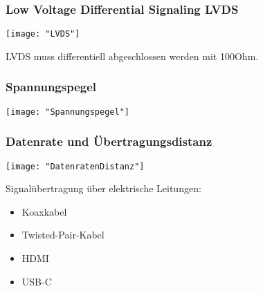 \subsubsection{Low Voltage Differential Signaling LVDS}
\begin{minipage}[t]{0.3\textwidth}
	\vspace{0pt}								%
	\texttt{[image: "LVDS"]}
\end{minipage}\hspace{0.05\textwidth}
\begin{minipage}[t]{0.65\textwidth}
	\vspace{0pt}								%
	LVDS muss differentiell abgeschlossen werden mit 100Ohm.
\end{minipage}
\vspace{2mm}

\subsubsection{Spannungspegel}
\begin{minipage}[t]{0.3\textwidth}
	\vspace{0pt}								%
	\texttt{[image: "Spannungspegel"]}
\end{minipage}\hspace{0.05\textwidth}
\begin{minipage}[t]{0.65\textwidth}
	\vspace{0pt}								%
	
\end{minipage}
\vspace{2mm}


\subsubsection{Datenrate und Übertragungsdistanz}
\begin{minipage}[t]{0.3\textwidth}
	\vspace{0pt}								%
	\texttt{[image: "DatenratenDistanz"]}
\end{minipage}\hspace{0.05\textwidth}
\begin{minipage}[t]{0.65\textwidth}
	\vspace{0pt}
	Signalübertragung über elektrische Leitungen:								%
	\begin{itemize}
		\item Koaxkabel
		\item Twisted-Pair-Kabel
		\item HDMI
		\item USB-C
	\end{itemize}
\end{minipage}
\vspace{2mm}




